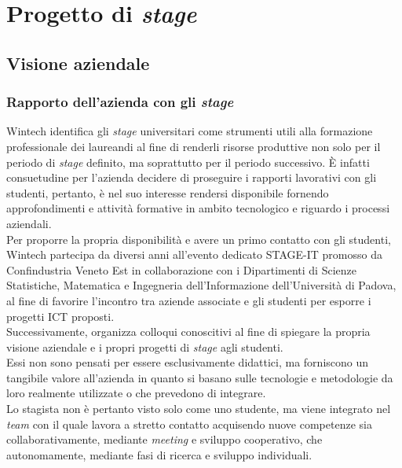 \chapter{Progetto di \emph{stage}}
\label{cap:progettoDiStage}

\section{Visione aziendale}
\subsection{Rapporto dell'azienda con gli \emph{stage}}
Wintech identifica gli \emph{stage} universitari come strumenti utili alla formazione professionale dei laureandi al fine di renderli risorse produttive non solo per il periodo di \emph{stage} definito, ma soprattutto per il periodo successivo. È infatti consuetudine per l'azienda decidere di proseguire i rapporti lavorativi con gli studenti, pertanto, è nel suo interesse rendersi disponibile fornendo approfondimenti e attività formative in ambito tecnologico e riguardo i processi aziendali.\\
Per proporre la propria disponibilità e avere un primo contatto con gli studenti, Wintech partecipa da diversi anni all'evento dedicato STAGE-IT promosso da Confindustria Veneto Est in collaborazione con i Dipartimenti di Scienze Statistiche, Matematica e Ingegneria dell'Informazione dell'Università di Padova, al fine di favorire l'incontro tra aziende associate e gli studenti per esporre i progetti \gls{ICT} proposti.\\
Successivamente, organizza colloqui conoscitivi al fine di spiegare la propria visione aziendale e i propri progetti di \emph{stage} agli studenti.\\
Essi non sono pensati per essere esclusivamente didattici, ma forniscono un tangibile valore all'azienda in quanto si basano sulle tecnologie e metodologie da loro realmente utilizzate o che prevedono di integrare.\\
Lo stagista non è pertanto visto solo come uno studente, ma viene integrato nel \emph{team} con il quale lavora a stretto contatto acquisendo nuove competenze sia collaborativamente, mediante \emph{meeting} e sviluppo cooperativo, che autonomamente, mediante fasi di ricerca e sviluppo individuali.\\

